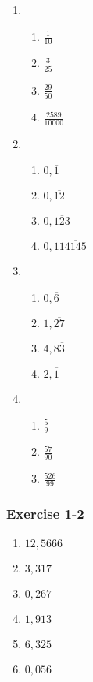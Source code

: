 {\begin{multicols}{3}
\begin{enumerate}[noitemsep, label=\textbf{\arabic*}. ]
 \item %
    \begin{enumerate}[noitemsep, label=\textbf{(\alph*)} ] 
    \item $\frac{1}{10}$
    \item $\frac{3}{25}$%
    \item $\frac{29}{50}$%
    \item $\frac{2589}{10000}$%
    \end{enumerate}
\item%
    \begin{enumerate}[noitemsep, label=\textbf{(\alph*)} ] 
    \item $0,\overline{1}$%
    \item $0,\overline{12}$%
    \item $0,\overline{123}$%
    \item $0,11\overline{4145}$%
    \end{enumerate}
\item %
    \begin{enumerate}[noitemsep, label=\textbf{(\alph*)} ] 
    \item $0,\overline{6}$%
    \item $1,\overline{27}$%
    \item $4,8\overline{3}$%
    \item $2,\overline{1}$%
    \end{enumerate}
\item %
    \begin{enumerate}[noitemsep, label=\textbf{(\alph*)} ] 
    \item $\frac{5}{9}$%
    \item $\frac{57}{90}$%
    \item $\frac{526}{99}$%
    \end{enumerate}
\end{enumerate}

\subsubsection*{Exercise 1-2} %

\begin{enumerate}[noitemsep, label=\textbf{\arabic*}. ]
 \item $12,5666$%
\item $3,317$%
\item $0,267$%
\item $1,913$
\item $6,325$%
\item $0,056$%
\end{enumerate}



\end{multicols}}
